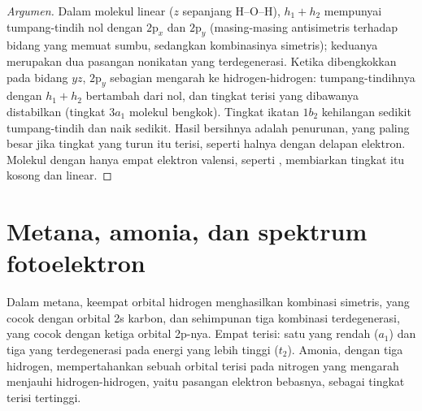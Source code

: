 \begin{proof}[Argumen]
Dalam molekul linear ($z$ sepanjang H--O--H), $h_1 + h_2$ mempunyai
tumpang-tindih nol dengan $2\mathrm p_x$ dan $2\mathrm p_y$ (masing-masing
antisimetris terhadap bidang yang memuat sumbu, sedangkan kombinasinya
simetris); keduanya merupakan dua pasangan nonikatan yang terdegenerasi.
Ketika dibengkokkan pada bidang $yz$, $2\mathrm p_y$ sebagian mengarah ke
hidrogen-hidrogen: tumpang-tindihnya dengan $h_1 + h_2$ bertambah dari
nol, dan tingkat terisi yang dibawanya distabilkan (tingkat $3a_1$ molekul
bengkok). Tingkat ikatan $1b_2$ kehilangan sedikit tumpang-tindih dan naik
sedikit. Hasil bersihnya adalah penurunan, yang paling besar jika tingkat
yang turun itu terisi, seperti halnya dengan delapan elektron. Molekul
dengan hanya empat elektron valensi, seperti , membiarkan tingkat
itu kosong dan linear.
\end{proof}

\section{Metana, amonia, dan spektrum fotoelektron}

Dalam metana, keempat orbital hidrogen menghasilkan kombinasi simetris,
yang cocok dengan orbital 2s karbon, dan sehimpunan tiga kombinasi
terdegenerasi, yang cocok dengan ketiga orbital 2p-nya. Empat  terisi: satu yang rendah ($a_1$) dan tiga yang terdegenerasi pada
energi yang lebih tinggi ($t_2$). Amonia, dengan tiga hidrogen,
mempertahankan sebuah orbital terisi pada nitrogen yang mengarah menjauhi
hidrogen-hidrogen, yaitu pasangan elektron bebasnya, sebagai tingkat
terisi tertinggi.

